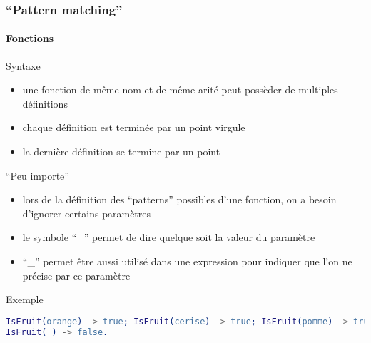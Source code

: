 \begin{frame}[fragile]
  \frametitle{``Pattern matching''}
  \framesubtitle{Fonctions}

  \begin{block}{Syntaxe}
    \begin{itemize}
    \item une fonction de même nom et de même arité peut possèder de multiples
      définitions
    \item chaque définition est terminée par un point virgule
    \item la dernière définition se termine par un point
    \end{itemize}
  \end{block}

  \begin{alertblock}{``Peu importe''}
    \begin{itemize}
    \item lors de la définition des ``patterns'' possibles d'une fonction,
      on a besoin d'ignorer certains paramètres
    \item le symbole ``\_'' permet de dire quelque soit la valeur du paramètre
    \item ``\_'' permet être aussi utilisé dans une expression pour
      indiquer que l'on ne précise par ce paramètre
    \end{itemize}
  \end{alertblock}

  \begin{exampleblock}{Exemple}
    \begin{lstlisting}[language=erlang]
IsFruit(orange) -> true; IsFruit(cerise) -> true; IsFruit(pomme) -> true;
IsFruit(_) -> false.
    \end{lstlisting}
  \end{exampleblock}

\end{frame}
